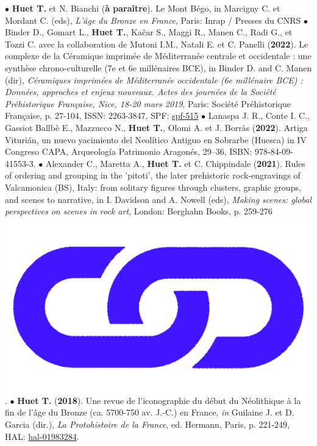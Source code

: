 \documentclass{article}
\begin{document}
{$\bullet$ \textbf{Huet T.} et N. Bianchi (\textbf{à paraître}). Le Mont Bégo, in Marcigny C. et Mordant C. (eds), \textit{L'âge du Bronze en France}, Paris: Inrap / Presses du CNRS
\smallbreak
$\bullet$ Binder D., Gomart L., \textbf{Huet T.}, Ka{\v{c}}ar S., Maggi R., Manen C., Radi G., et Tozzi C. avec la collaboration de Mutoni I.M., Natali E. et C. Panelli (\textbf{2022}). Le complexe de la C\'{e}ramique imprim\'{e}e de M\'{e}diterran\'{e}e centrale et occidentale : une synthèse chrono-culturelle (7e et 6e millénaires BCE), in Binder D. and C. Manen (dir), \textit{C\'{e}ramiques imprim\'{e}es de M\'{e}diterran\'{e}e occidentale (6e mill\'{e}naire BCE) : Donn\'{e}es, approches et enjeux nouveaux. Actes des journ\'{e}es de la Soci\'{e}t\'{e} Pr\'{e}historique Fran\c{c}aise, Nice, 18-20 mars 2019}, Paris: Soci\'{e}t\'{e} Pr\'{e}historique Fran\c{c}aise, p. 27-104, ISSN: 2263-3847, SPF: \href{https://www.prehistoire.org/515_p_57657/accEs-libre-seance-18-ceramiques-imprimees-de-mediterranee-occidentale.html}{spf-515}
\smallbreak
$\bullet$ Lanaspa J. R., Conte I. C., Gassiot Ballbè E., Mazzucco N., \textbf{Huet T.}, Olomi A. et J. Borràs (\textbf{2022}). Artiga Viturián, un nuevo yacimiento del Neolítico Antiguo en Sobrarbe (Huesca) in IV Congreso CAPA, Arqueología Patrimonio Aragonés, 29–36, ISBN: 978-84-09-41553-3.
\smallbreak
$\bullet$ Alexander C., Maretta A., \textbf{Huet T.} et C. Chippindale (\textbf{2021}). Rules of ordering and grouping in the 'pitoti', the later prehistoric rock-engravings of Valcamonica (BS), Italy: from solitary figures through clusters, graphic groups, and scenes to narrative, in I. Davidson and A. Nowell (eds), \textit{Making scenes: global perspectives on scenes in rock art}, London: Berghahn Books, p. 259-276 \href{https://www.berghahnbooks.com/title/DavidsonMaking}{\includegraphics[scale=0.02]{link_darkblue.png}}.
\smallbreak
$\bullet$ \textbf{Huet T.} (\textbf{2018}). Une revue de l'iconographie du d\'{e}but du N\'{e}olithique \`{a} la fin de l'\^{a}ge du Bronze (ca. 5700-750 av. J.-C.) en France, \textit{in} Guilaine J. et D. Garcia (dir.), \textit{La Protohistoire de la France}, ed. Hermann, Paris, p. 221-249, HAL: \href{https://hal.archives-ouvertes.fr/hal-01983284}{hal-01983284}.
\bigbreak

}
\end{document}
